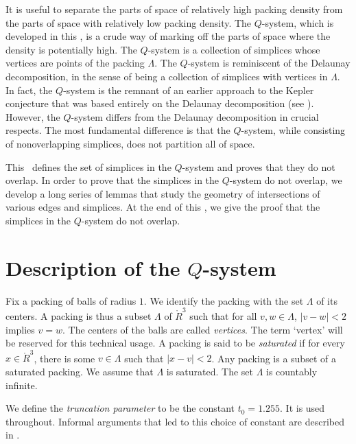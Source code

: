 It is useful to separate the parts of space of relatively high
packing density from the parts of space with relatively low packing
density.  The $Q$-system, which is developed in this \chap, is a
crude way of marking off the parts of space where the density is
potentially high.  The $Q$-system is a collection of simplices whose
vertices are points of the packing $\Lambda$. The $Q$-system is
reminiscent of the Delaunay decomposition, in the sense of being a
collection of simplices with vertices in $\Lambda$.  In fact, the
$Q$-system is the remnant of an earlier approach to the Kepler
conjecture that was based entirely on the Delaunay decomposition
(see \cite{remarks}).  However, the $Q$-system differs from the
Delaunay decomposition in crucial respects.  The most fundamental
difference is that the $Q$-system, while consisting of
nonoverlapping simplices, does not partition all of space.

This \chap\ defines the set of simplices in the $Q$-system and
proves that they do not overlap.  In order to prove that the
simplices in the $Q$-system do not overlap,  we develop a long
series of lemmas that study the geometry of intersections of
various edges and simplices.  At the end of this \chap, we give
the proof that the simplices in the $Q$-system do not overlap.

\section{Description of the $Q$-system}
\label{sec:Q-describe}



Fix a packing of balls of radius $1$. We identify the packing with
the set $\Lambda$ of its centers.  A packing is thus a subset
$\Lambda$ of $\ring{R}^3$ such that for all $v,w\in\Lambda$,
$|v-w|<2$ implies $v=w$. The centers of the balls are called {\it
{} vertices}. The term `vertex' will be reserved for
this technical usage.  A packing is said to be {\it
{} saturated\/} if for every $x\in\ring{R}^3$,
there is some $v\in\Lambda$ such that $|x-v|<2$. Any packing is a
subset of a saturated packing. We assume that $\Lambda$ is
saturated. The set $\Lambda$ is countably infinite.

\begin{definition}  We define the {\it truncation parameter}
 to be the constant
$t_0=1.255$. It is used throughout. Informal arguments that led to
this choice of constant are described in
\longversion{\Part~\ref{part:intro}}.
\end{definition}

